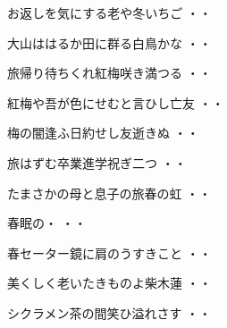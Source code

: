 \vspace{0.6cm}
\begin{shiika}お返しを気にする老や冬いちご
\hfill{・・}\end{shiika}
\vspace{0.6cm}
\begin{shiika}大山ははるか田に群る白鳥かな
\hfill{・・}\end{shiika}
\vspace{0.6cm}
\begin{shiika}旅帰り待ちくれ紅梅咲き満つる
\hfill{・・}\end{shiika}
\vspace{0.6cm}
\begin{shiika}紅梅や吾が色にせむと言ひし亡友
\hfill{・・}\end{shiika}
\vspace{0.6cm}
\begin{shiika}梅の闇逢ふ日約せし友逝きぬ
\hfill{・・}\end{shiika}
\vspace{0.6cm}
\begin{shiika}旅はずむ卒業進学祝ぎ二つ
\hfill{・・}\end{shiika}
\vspace{0.6cm}
\begin{shiika}たまさかの母と息子の旅春の虹
\hfill{・・}\end{shiika}
\vspace{0.6cm}
\begin{shiika}春眠の・
\hfill{・・}\end{shiika}
\vspace{0.6cm}
\begin{shiika}春セーター鏡に肩のうすきこと
\hfill{・・}\end{shiika}
\vspace{0.6cm}
\begin{shiika}美くしく老いたきものよ柴木蓮
\hfill{・・}\end{shiika}
\vspace{0.6cm}
\begin{shiika}シクラメン茶の間笑ひ溢れさす
\hfill{・・}\end{shiika}
